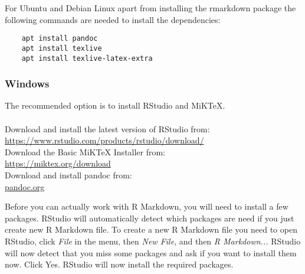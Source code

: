 For Ubuntu and Debian Linux apart from installing the rmarkdown package the following commands are needed to install the dependencies:

\begin{verbatim}
    apt install pandoc
    apt install texlive
    apt install texlive-latex-extra
\end{verbatim}

\subsubsection{Windows}

The recommended option is to install RStudio and MiKTeX.\\ \\
Download and install the latest version of RStudio from: \\
\url{https://www.rstudio.com/products/rstudio/download/} \\
Download the Basic MiKTeX Installer from: \\
\url{https://miktex.org/download} \\
Download and install pandoc from: \\
\url{pandoc.org}

Before you can actually work with R Markdown, you will need to install a few packages. RStudio will automatically detect which packages are need if you just create new R Markdown file. To create a new R Markdown file you need to open RStudio, click {\it File} in the menu, then {\it New File}, and then {\it R Markdown...} RStudio will now detect that you miss some packages and ask if you want to install them now. Click Yes. RStudio will now install the required packages.


